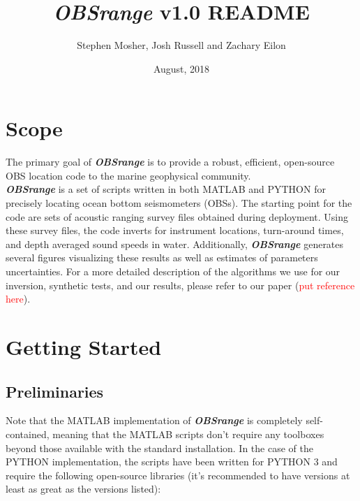 \documentclass[titlepage]{article}
\begin{document}
 \title{\textbf{\textit{\textit{\textbf{OBSrange}}}} v1.0 README}
 \author{Stephen Mosher, Josh Russell and Zachary Eilon}
 \date{August, 2018}
 \maketitle{}

 \tableofcontents

 \section{Scope}
   The primary goal of \textit{\textbf{OBSrange}} is to provide a robust, efficient, open-source OBS location code to the marine geophysical community.\\ 

   \textit{\textbf{OBSrange}} is a set of scripts written in both MATLAB and PYTHON for precisely locating ocean bottom seismometers (OBSs). The starting point for the code are sets of acoustic ranging survey files obtained during deployment. Using these survey files, the code inverts for instrument locations, turn-around times, and depth averaged sound speeds in water. Additionally, \textit{\textbf{OBSrange}} generates several figures visualizing these results as well as estimates of parameters uncertainties. For a more detailed description of the algorithms we use for our inversion, synthetic tests, and our results, please refer to our paper (\textcolor{red}{put reference here}).

 \section{Getting Started}
  
  \subsection{Preliminaries}
  Note that the MATLAB implementation of \textit{\textbf{OBSrange}} is completely self-contained, meaning that the MATLAB scripts don’t require any toolboxes beyond those available with the standard installation. In the case of the PYTHON implementation, the scripts have been written for PYTHON 3 and require the following open-source libraries (it’s recommended to have versions at least as great as the versions listed):
\end{document}
